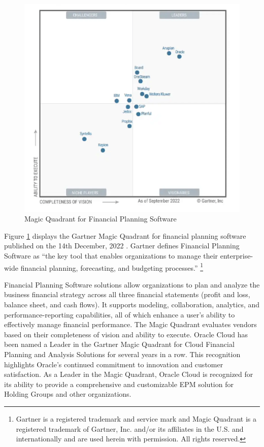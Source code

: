 \documentclass[12pt,a4paper,openright,twoside]{book}
\begin{document}
\begin{figure}[htbp]
	\centering
	\includegraphics[width=\linewidth]{figures/gartner.pdf}
	\caption{Magic Quadrant for Financial Planning Software}
	\label{fig:gartner}
\end{figure}

Figure \ref{fig:gartner} displays the Gartner Magic Quadrant for financial planning software published on the 14th December, 2022 \cite{gartner2022magic}.
%
Gartner defines Financial Planning Software as ``the key tool that enables organizations to manage their enterprise-wide financial planning, forecasting, and budgeting processes.'' \footnote{Gartner is a registered trademark and service mark and Magic Quadrant is a registered trademark of Gartner, Inc. and/or its affiliates in the U.S. and internationally and are used herein with permission. All rights reserved.}

Financial Planning Software solutions allow organizations to plan and analyze the business financial strategy across all three financial statements (profit and loss, balance sheet, and cash flows). 
%
It supports modeling, collaboration, analytics, and performance-reporting capabilities, all of which enhance a user’s ability to effectively manage financial performance.
%
The Magic Quadrant evaluates vendors based on their completeness of vision and ability to execute. 
%
Oracle Cloud has been named a Leader in the Gartner Magic Quadrant for Cloud Financial Planning and Analysis Solutions for several years in a row. 
%
This recognition highlights Oracle's continued commitment to innovation and customer satisfaction. 
%
As a Leader in the Magic Quadrant, Oracle Cloud is recognized for its ability to provide a comprehensive and customizable EPM solution for Holding Groups and other organizations.
\end{document}
